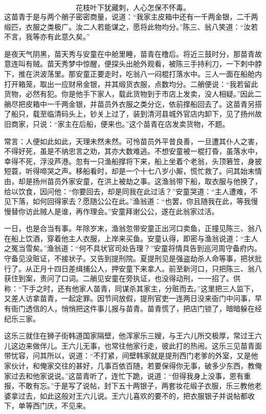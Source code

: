\[
花枝叶下犹藏刺，人心怎保不怀毒。
\]
这苗青于是与两个艄子密密商量，说道：“我家主皮箱中还有一千两金银，二千两缎匹，衣服之类极广。汝二人若能谋之，愿将此物均分。”陈三、翁八笑道：“汝若不言，我等亦有此意久矣。”

是夜天气阴黑，苗天秀与安童在中舱里睡，苗青在橹后。将近三鼓时分，那苗青故意连叫有贼。苗天秀梦中惊醒，便探头出舱外观看，被陈三手持利刀，一下刺中脖下，推在洪波荡里。那安童正要走时，吃翁八一闷棍打落水中。三人一面在船舱内打开箱笼，取出一应财帛金银，并其缎货衣服，点数均分。二艄便说：“我若留此货物，必然有犯。你是他手下家人，载此货物到于市店上发卖，没人相疑。”因此二艄尽把皮箱中一千两金银，并苗员外衣服之类分讫，依前撑船回去了。这苗青另搭了船只，载至临清码头上，钞关上过了，装到清河县城外官店内卸下，见了扬州故旧商家，只说：“家主在后船，便来也。”这个苗青在店发卖货物，不题。

常言：人便如此如此，天理未然未然。可怜苗员外平昔良善，一旦遭其仆人之害，不得好死，虽是不纳忠言之劝，其亦大数难逃。不想安童被一棍打昏，虽落水中，幸得不死，浮没芦港。忽有一只渔船撑将下来，船上坐着个老翁，头顶箬笠，身披短蓑，听得啼哭之声。移船看时，却是一个十七八岁小厮，慌忙救了。问其始末情由，却是扬州苗员外家安童，在洪上被劫之事。这渔翁带下船，取衣服与他换了，给以饮食，因问他：“你要回去，却是同我在此过活？”安童哭道：“主人遭难，不见下落，如何回得家去？愿随公公在此。”渔翁道：“也罢，你且随我在此，等我慢慢替你访此贼人是谁，再作理会。”安童拜谢公公，遂在此翁家过活。

一日，也是合当有事。年除岁末，渔翁忽带安童正出河口卖鱼，正撞见陈三、翁八在船上饮酒，穿着他主人衣服，上岸来买鱼。安童认得，即密与渔翁说道：“主人之冤当雪矣。”渔翁道：“何不具状官司处告理？”安童将情具告到巡河周守备府内。守备见没赃证，不接状子。又告到提刑院。夏提刑见是强盗劫杀人命等事，把状批行了。从正月十四日差缉捕公人，押安童下来拿人。前至新河口，只把陈三、翁八获住到案，责问了口词。二艄见安童在旁执证，也没得动刑，一一招了。供称：“下手之时，还有他家人苗青，同谋杀其家主，分赃而去。”这里把三人监下，又差人访拿苗青，一起定罪。因节间放假，提刑官吏一连两日没来衙门中问事，早有衙门透信的人，悄悄把这件事儿报与苗青。苗青慌了，把店门锁了，暗暗躲在经纪乐三家。

这乐三就住在狮子街韩道国家隔壁，他浑家乐三嫂，与王六儿所交极厚，常过王六儿这边来做伴儿。王六儿无事，也常往他家行走，彼此打的热闹。这乐三见苗青面带忧容，问其所以，说道：“不打紧，间壁韩家就是提刑西门老爹的外室，又是他家伙计，和俺家交往的甚好，几事百依百随，若要保得你无事，破多少东西，教俺家过去和他家说说。”这苗青听了，连忙下跪，说道：“但得我身上没事，恩有重报，不敢有忘。”于是写了说帖，封下五十两银子，两套妆花缎子衣服，乐三教他老婆拿过去，如此这般对王六儿说。王六儿喜欢的要不的，把衣服银子并说帖都收下，单等西门庆，不见来。


